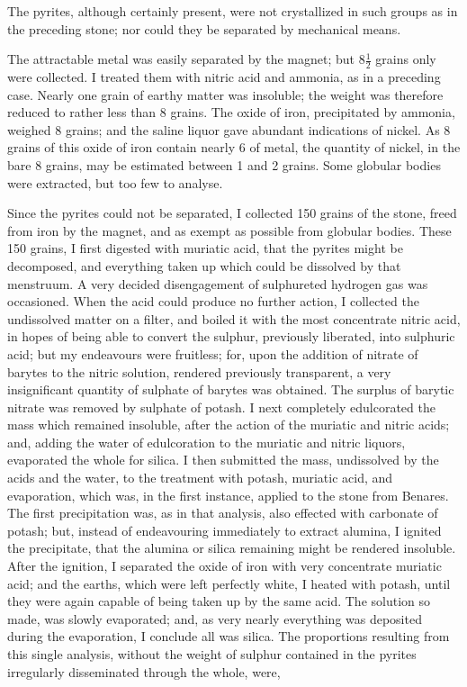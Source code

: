 \documentclass[a4paper, 12pt, oneside, twocolumn]{article}
\begin{document}
The pyrites, although certainly present, were not crystallized in such groups as in the preceding stone; nor could they be separated by mechanical means.

The attractable metal was easily separated by the magnet; but $8\frac{1}{2}$ grains only were collected. I treated them with nitric acid and ammonia, as in a preceding case. Nearly one grain of earthy matter was insoluble; the weight was therefore reduced to rather less than 8 grains. The oxide of iron, precipitated by ammonia, weighed 8 grains; and the saline liquor gave abundant indications of nickel. As 8 grains of this oxide of iron contain nearly 6 of metal, the quantity of nickel, in the bare 8 grains, may be estimated between 1 and 2 grains. Some globular bodies were extracted, but too few to analyse.

Since the pyrites could not be separated, I collected 150 grains of the stone, freed from iron by the magnet, and as exempt as possible from globular bodies. These 150 grains, I first digested with muriatic acid, that the pyrites might be decomposed, and everything taken up which could be dissolved by that menstruum. A very decided disengagement of sulphureted hydrogen gas was occasioned. When the acid could produce no further action, I collected the undissolved matter on a filter, and boiled it with the most concentrate nitric acid, in hopes of being able to convert the sulphur, previously liberated, into sulphuric acid; but my endeavours were fruitless; for, upon the addition of nitrate of barytes to the nitric solution, rendered previously transparent, a very insignificant quantity of sulphate of barytes was obtained. The surplus of barytic nitrate was removed by sulphate of potash. I next completely edulcorated the mass which remained insoluble, after the action of the muriatic and nitric acids; and, adding the water of edulcoration to the muriatic and nitric liquors, evaporated the whole for silica. I then submitted the mass, undissolved by the acids and the water, to the treatment with potash, muriatic acid, and evaporation, which was, in the first instance, applied to the stone from Benares. The first precipitation was, as in that analysis, also effected with carbonate of potash; but, instead of endeavouring immediately to extract alumina, I ignited the precipitate, that the alumina or silica remaining might be rendered insoluble. After the ignition, I separated the oxide of iron with very concentrate muriatic acid; and the earths, which were left perfectly white, I heated with potash, until they were again capable of being taken up by the same acid. The solution so made, was slowly evaporated; and, as very nearly everything was deposited during the evaporation, I conclude all was silica. The proportions resulting from this single analysis, without the weight of sulphur contained in the pyrites irregularly disseminated through the whole, were,
\end{document}
